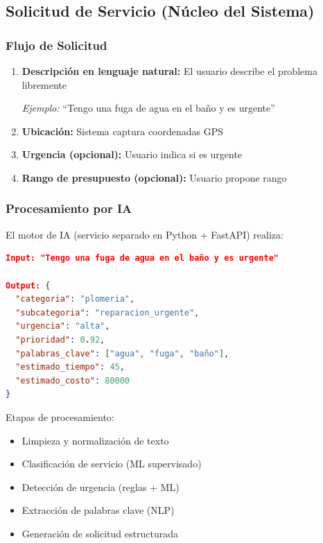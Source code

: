 \documentclass[12pt,a4paper,spanish]{article}
\begin{document}
\subsection{Solicitud de Servicio (Núcleo del Sistema)}

\subsubsection{Flujo de Solicitud}

\begin{enumerate}
    \item \textbf{Descripción en lenguaje natural:} El usuario describe el problema libremente

    \textit{Ejemplo:} ``Tengo una fuga de agua en el baño y es urgente''

    \item \textbf{Ubicación:} Sistema captura coordenadas GPS

    \item \textbf{Urgencia (opcional):} Usuario indica si es urgente

    \item \textbf{Rango de presupuesto (opcional):} Usuario propone rango
\end{enumerate}

\subsubsection{Procesamiento por IA}

El motor de IA (servicio separado en Python + FastAPI) realiza:

\begin{lstlisting}[language=json]
Input: "Tengo una fuga de agua en el baño y es urgente"

Output: {
  "categoria": "plomeria",
  "subcategoria": "reparacion_urgente",
  "urgencia": "alta",
  "prioridad": 0.92,
  "palabras_clave": ["agua", "fuga", "baño"],
  "estimado_tiempo": 45,
  "estimado_costo": 80000
}
\end{lstlisting}

Etapas de procesamiento:
\begin{itemize}
    \item Limpieza y normalización de texto
    \item Clasificación de servicio (ML supervisado)
    \item Detección de urgencia (reglas + ML)
    \item Extracción de palabras clave (NLP)
    \item Generación de solicitud estructurada
\end{itemize}
\end{document}
